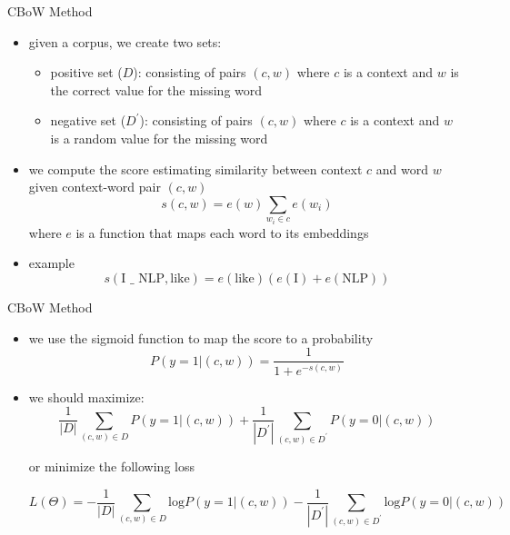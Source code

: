 \begin{frame}{CBoW Method}
    \begin{itemize}
        \item<1-> given a corpus, we create two sets:
            \begin{itemize}
                \item<2-> positive set ($D$): consisting of pairs $(c, w)$ where $c$ is a context and $w$ is the correct value for the missing word
                \item<3-> negative set ($D^\prime$): consisting of pairs $(c, w)$ where $c$ is a context and $w$ is a random value for the missing word
            \end{itemize}
            \item<4-> we compute the score estimating similarity between context $c$  and word $w$ given context-word pair $(c,w)$
        \begin{equation*}
            s(c,w) = e(w)\sum_{w_i \in c} e(w_i)
        \end{equation*}
        where $e$ is a function that maps each word to its embeddings
        \item<5-> example
        \begin{equation*}
            s(\text{I }\_\text{ NLP},\text{like}) = e(\text{like})(e(\text{I})+e(\text{NLP}))
        \end{equation*}
    \end{itemize}
\end{frame}
\begin{frame}{CBoW Method}
        \begin{itemize}
            
            \item<1-> we use the sigmoid function to map the score to a probability
            \begin{equation*}
                P(y=1|(c,w)) = \frac{1}{1+ e^{-s(c,w)}}
            \end{equation*}
            \item<2-> we should maximize:
            \begin{equation*}
                \frac{1}{|D|} \sum_{(c,w)\in D} P(y=1|(c,w)) + 
                \frac{1}{|D^\prime|} \sum_{(c,w)\in D^\prime} P(y=0|(c,w))
            \end{equation*}
            {
            
            or minimize the following loss
            \begin{small}
            \begin{equation*}
                L(\Theta) =  -\frac{1}{|D|}\sum_{(c,w)\in D}\text{log}P(y=1|(c,w)) - \frac{1}{|D^\prime|}\sum_{(c,w)\in D^\prime}\text{log}P(y=0|(c,w))
            \end{equation*}
            \end{small}
            }
        \end{itemize}
\end{frame}
